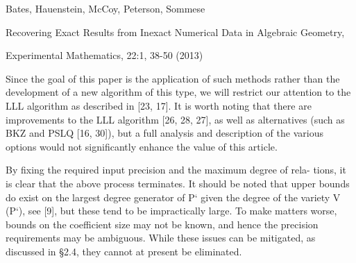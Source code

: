 \documentclass{beamer}
\begin{document}
\begin{frame}
\begin{exampleblock}{Bates, Hauenstein, McCoy, Peterson, Sommese

Recovering Exact Results from Inexact Numerical Data in Algebraic Geometry,

Experimental Mathematics, 22:1, 38-50 (2013)}

Since the goal of this paper is the application of such methods rather than the
development of a new algorithm of this type, we will restrict our attention
to the LLL algorithm as described in [23, 17]. It is worth noting that there
are improvements to the LLL algorithm [26, 28, 27], as well as alternatives
(such as BKZ and PSLQ [16, 30]), but a full analysis and description of the
various options would not significantly enhance the value of this article.

By fixing the required input precision and the maximum degree of rela-
tions, it is clear that the above process terminates. It should be noted that
upper bounds do exist on the largest degree generator of P` given the degree
of the variety V (P`), see [9], but these tend to be impractically large. To
make matters worse, bounds on the coefficient size may not be known, and
hence the precision requirements may be ambiguous. While these issues can
be mitigated, as discussed in §2.4, they cannot at present be eliminated.

\end{exampleblock}

\end{frame}
\end{document}
